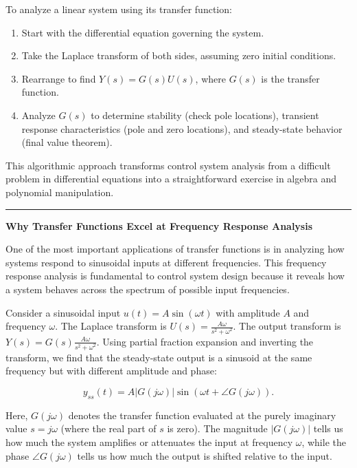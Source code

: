 \begin{algorithm}
To analyze a linear system using its transfer function:

\begin{enumerate}
\item Start with the differential equation governing the system.
\item Take the Laplace transform of both sides, assuming zero initial conditions.
\item Rearrange to find $Y(s) = G(s) U(s)$, where $G(s)$ is the transfer function.
\item Analyze $G(s)$ to determine stability (check pole locations), transient response characteristics (pole and zero locations), and steady-state behavior (final value theorem).
\end{enumerate}
\end{algorithm}

This algorithmic approach transforms control system analysis from a difficult problem in differential equations into a straightforward exercise in algebra and polynomial manipulation.

\vspace{1em}
\hrule
\vspace{0.5em}
\color{UofSCGarnet}\textbf{Why Transfer Functions Excel at Frequency Response Analysis}\color{UofSCBlack}
\vspace{0.5em}

One of the most important applications of transfer functions is in analyzing how systems respond to sinusoidal inputs at different frequencies. This frequency response analysis is fundamental to control system design because it reveals how a system behaves across the spectrum of possible input frequencies.

Consider a sinusoidal input $u(t) = A \sin(\omega t)$ with amplitude $A$ and frequency $\omega$. The Laplace transform is $U(s) = \frac{A\omega}{s^2 + \omega^2}$. The output transform is $Y(s) = G(s) \frac{A\omega}{s^2 + \omega^2}$. Using partial fraction expansion and inverting the transform, we find that the steady-state output is a sinusoid at the same frequency but with different amplitude and phase:

\[
y_{ss}(t) = A |G(j\omega)| \sin(\omega t + \angle G(j\omega)).
\]

Here, $G(j\omega)$ denotes the transfer function evaluated at the purely imaginary value $s = j\omega$ (where the real part of $s$ is zero). The magnitude $|G(j\omega)|$ tells us how much the system amplifies or attenuates the input at frequency $\omega$, while the phase $\angle G(j\omega)$ tells us how much the output is shifted relative to the input.

